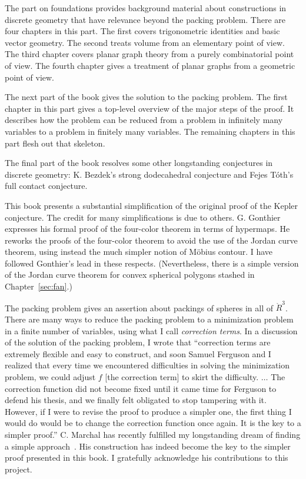 The part on foundations provides background material about
constructions in discrete geometry that have relevance beyond the
packing problem.  There are four chapters in this part.  The first
covers trigonometric identities and basic vector geometry.  The second
treats volume from an elementary point of view.  The third chapter
covers planar graph theory from a purely combinatorial point of view.
The fourth chapter gives a treatment of planar graphs from a 
geometric point of view.

The next part of the book gives the solution to the packing problem.
The first chapter in this part gives a top-level overview of the major
steps of the proof.  It describes how the problem can be reduced from
a problem in infinitely many variables to a problem in finitely many
variables.  The remaining chapters in this part flesh out that
skeleton.

The final part of the book resolves some other longstanding conjectures in
discrete geometry: K. Bezdek's strong dodecahedral conjecture and Fejes
T\'oth's full contact conjecture.

This book presents a substantial simplification of the original proof
of the Kepler conjecture.  The credit for many simplifications is due
to others.  G. Gonthier expresses his formal proof of the four-color
theorem in terms of hypermaps.  He reworks the proofs of the
four-color theorem to avoid the use of the Jordan curve theorem, using
instead the much simpler notion of M\"obius contour.  I have followed
Gonthier's lead in these respects.  (Nevertheless, there is a simple version
of the Jordan curve theorem for convex spherical polygons stashed in
Chapter~\ref{sec:fan}.)

The packing problem gives an assertion about packings of spheres in
all of $\ring{R}^3$.  There are many ways to reduce the packing
problem to a minimization problem in a finite number of variables,
using what I call {\it correction terms}.  In a discussion of the
solution of the packing problem, I wrote that ``correction terms are
extremely flexible and easy to construct, and soon Samuel Ferguson and
I realized that every time we encountered difficulties in solving the
minimization problem, we could adjust $f$ [the correction term] to
skirt the difficulty. $\ldots$ The correction function did not become
fixed until it came time for Ferguson to defend his thesis, and we
finally felt obligated to stop tampering with it.  However, if I were
to revise the proof to produce a simpler one, the first thing I would
do would be to change the correction function once again.  It is the
key to a simpler proof.''  
C. Marchal has recently fulfilled my longstanding 
dream of finding a simple approach~\cite{unknown}.  His construction 
 has indeed become the key to the simpler proof presented in this
book.  I gratefully acknowledge his contributions to this project.


